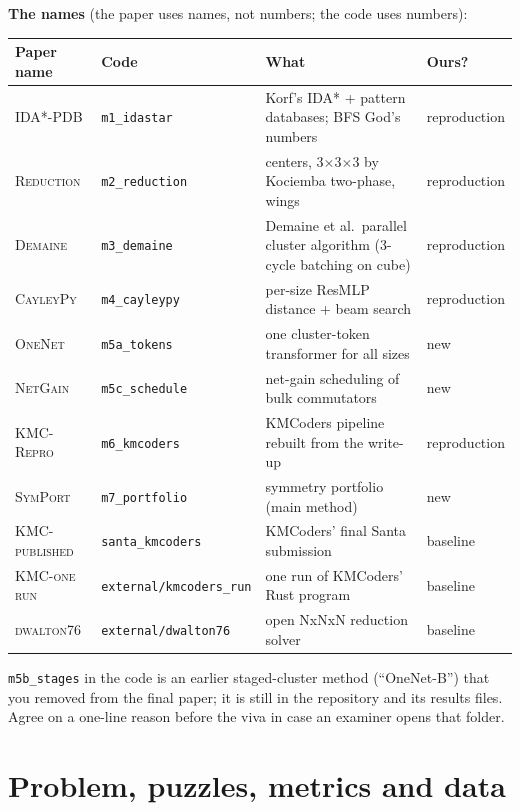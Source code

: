 \documentclass[10.5pt,a4paper]{article}
\newcommand{\M}[1]{\textsc{#1}}
\begin{document}
\textbf{The names} (the paper uses names, not numbers; the code uses numbers):
\begin{center}\small
\begin{tabularx}{\textwidth}{@{}llXl@{}}
\toprule
Paper name & Code & What & Ours? \\
\midrule
\M{IDA*-PDB} & \texttt{m1\_idastar} & Korf's IDA* + pattern databases; BFS God's numbers & reproduction \\
\M{Reduction} & \texttt{m2\_reduction} & centers, 3$\times$3$\times$3 by Kociemba two-phase, wings & reproduction \\
\M{Demaine} & \texttt{m3\_demaine} & Demaine et al.\ parallel cluster algorithm (3-cycle batching on cube) & reproduction \\
\M{CayleyPy} & \texttt{m4\_cayleypy} & per-size ResMLP distance + beam search & reproduction \\
\M{OneNet} & \texttt{m5a\_tokens} & one cluster-token transformer for all sizes & new \\
\M{NetGain} & \texttt{m5c\_schedule} & net-gain scheduling of bulk commutators & new \\
\M{KMC-Repro} & \texttt{m6\_kmcoders} & KMCoders pipeline rebuilt from the write-up & reproduction \\
\M{SymPort} & \texttt{m7\_portfolio} & symmetry portfolio (main method) & new \\
\M{KMC-published} & \texttt{santa\_kmcoders} & KMCoders' final Santa submission & baseline \\
\M{KMC-one run} & \texttt{external/kmcoders\_run} & one run of KMCoders' Rust program & baseline \\
\M{dwalton76} & \texttt{external/dwalton76} & open NxNxN reduction solver & baseline \\
\bottomrule
\end{tabularx}
\end{center}
\texttt{m5b\_stages} in the code is an earlier staged-cluster method (``OneNet-B'') that you removed from the final paper; it is
still in the repository and its results files. Agree on a one-line reason before the viva in case an examiner opens that folder.

\section{Problem, puzzles, metrics and data}
\end{document}
